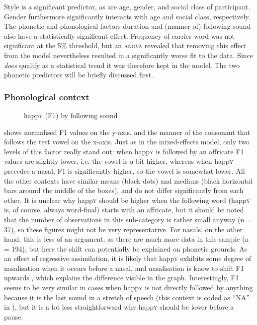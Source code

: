 Style is a significant predictor, as are age, gender, and social class of participant.
Gender furthermore significantly interacts with age and social class, respectively.
The phonetic and phonological factors duration and (manner of) following sound also have a statistically significant effect.
Frequency of carrier word was not significant at the 5\% threshold, but an \textsc{anova} revealed that removing this effect from the model nevertheless resulted in a significantly worse fit to the data.
Since  \emph{does} qualify as a statistical trend it was therefore kept in the model.
The two phonetic predictors will be briefly discussed first.

			\subsubsection{Phonological context}
			\label{sec.prod.res.vow.happy.f1.phon}

	\begin{figure}
		
		\resizebox{0.5\linewidth}{!}{} 
		\caption{happ\textsc{y} (F1) by following sound}
		\label{fig.box.f1w.happy.follsound}
	\end{figure}

 shows normalised F1 values on the y-axis, and the manner of the consonant that follows the test vowel on the x-axis.
Just as in the mixed-effects model, only two levels of this factor really stand out: when happ\textsc{y} is followed by an affricate F1 values are slightly lower, i.e. the vowel is a bit higher, whereas when happ\textsc{y} precedes a nasal, F1 is significantly higher, so the vowel is somewhat lower.
All the other contexts have similar means (black dots) and medians (black horizontal bars around the middle of the boxes), and do not differ significantly from each other.
It is unclear why happ\textsc{y} should be higher when the following word (happ\textsc{y} is, of course, always word-final) starts with an affricate, but it should be noted that the number of observations in this sub-category is rather small anyway (n = 37), so these figures might not be very representative.
For nasals, on the other hand, this is less of an argument, as there are much more data in this sample (n = 194), but here the shift can potentially be explained on phonetic grounds.
As an effect of regressive assimilation, it is likely that happ\textsc{y} exhibits some degree of nasalisation when it occurs before a nasal, and nasalisation is know to shift F1 upwards \parencite{housestevens1956}, which explains the difference visible in the graph.
Interestingly, F1 seems to be very similar in cases when happ\textsc{y} is not directly followed by anything because it is the last sound in a stretch of speech (this context is coded as ``NA'' in ), but it is a lot less straightforward why happ\textsc{y} should be lower before a pause.

